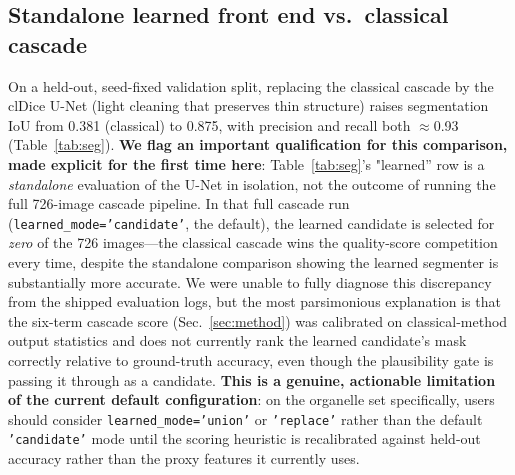 \documentclass[10pt,a4paper]{article}
\begin{document}
\subsection{Standalone learned front end vs.\ classical cascade}
\label{sec:seg-standalone}
On a held-out, seed-fixed validation split, replacing the classical cascade
by the clDice U-Net (light cleaning that preserves thin structure) raises
segmentation IoU from 0.381 (classical) to 0.875, with precision and recall
both $\approx$0.93 (Table~\ref{tab:seg}). \textbf{We flag an important
qualification for this comparison, made explicit for the first time here}:
Table~\ref{tab:seg}'s "learned'' row is a \emph{standalone} evaluation of the
U-Net in isolation, not the outcome of running the full 726-image cascade
pipeline. In that full cascade run (\texttt{learned\_mode='candidate'}, the
default), the learned candidate is selected for \emph{zero} of the 726
images---the classical cascade wins the quality-score competition every
time, despite the standalone comparison showing the learned segmenter is
substantially more accurate. We were unable to fully diagnose this
discrepancy from the shipped evaluation logs, but the
most parsimonious explanation is that the six-term cascade score
(Sec.~\ref{sec:method}) was calibrated on classical-method output
statistics and does not currently rank the learned candidate's mask
correctly relative to ground-truth accuracy, even though the plausibility
gate is passing it through as a candidate. \textbf{This is a genuine,
actionable limitation of the current default configuration}: on the
organelle set specifically, users should consider
\texttt{learned\_mode='union'} or \texttt{'replace'} rather than the default
\texttt{'candidate'} mode until the scoring heuristic is recalibrated against
held-out accuracy rather than the proxy features it currently uses.
\end{document}
